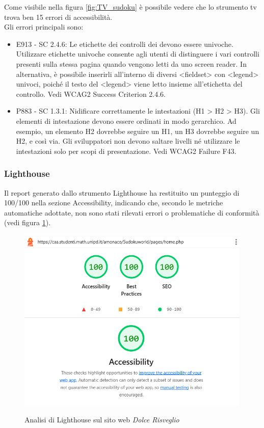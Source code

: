 \noindent Come visibile nella figura \ref{fig:TV_sudoku} è possibile vedere che lo strumento \acrshort{tv} trova ben 15 errori di accessibilità.\\
Gli errori principali sono: 
\begin{itemize}
    \item E913 - SC 2.4.6: Le etichette dei controlli dei  devono essere univoche. Utilizzare etichette univoche consente agli utenti di distinguere i vari controlli presenti sulla stessa pagina quando vengono letti da uno screen reader. In alternativa, è possibile inserirli all’interno di diversi <fieldset> con <legend> univoci, poiché il testo del <legend> viene letto insieme all’etichetta del controllo. Vedi WCAG2 Success Criterion 2.4.6.
    \item P883 - SC 1.3.1: Nidificare correttamente le intestazioni (H1 > H2 > H3). Gli elementi di intestazione devono essere ordinati in modo gerarchico. Ad esempio, un elemento H2 dovrebbe seguire un H1, un H3 dovrebbe seguire un H2, e così via. Gli sviluppatori non devono saltare livelli né utilizzare le intestazioni solo per scopi di presentazione. Vedi WCAG2 Failure F43.
\end{itemize}

\subsubsection{Lighthouse}
\noindent Il report generato dallo strumento Lighthouse ha restituito un punteggio di 100/100 nella sezione Accessibility, indicando che, secondo le metriche automatiche adottate, non sono stati rilevati errori o problematiche di conformità (vedi figura \ref{fig:Lighthouse_sudoku}).
\begin{figure}[H]
    \centering
    \includegraphics[width=0.6\linewidth, alt={Screenshot dell'analisi di Lighthouse sul sito web SudokuWorld}]{img/Lighthouse_sudoku.png}
    \caption{Analisi di Lighthouse sul sito web \textit{Dolce Risveglio}}\label{fig:Lighthouse_sudoku}
\end{figure}

